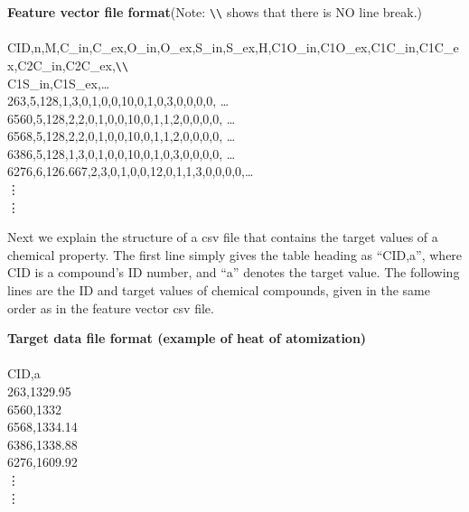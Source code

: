 \documentclass[11pt,titlepage,dvipdfmx,twoside]{article}
\begin{document}
\begin{oframed}
{\bf Feature vector file format}(Note: \verb|\\| shows that there is NO line break.)\\\\
CID,n,M,C\_in,C\_ex,O\_in,O\_ex,S\_in,S\_ex,H,C1O\_in,C1O\_ex,C1C\_in,C1C\_ex,C2C\_in,C2C\_ex,\verb|\\| \\
C1S\_in,C1S\_ex,\ldots \\
263,5,128,1,3,0,1,0,0,10,0,1,0,3,0,0,0,0, \ldots \\
6560,5,128,2,2,0,1,0,0,10,0,1,1,2,0,0,0,0, \ldots \\
6568,5,128,2,2,0,1,0,0,10,0,1,1,2,0,0,0,0, \ldots \\
6386,5,128,1,3,0,1,0,0,10,0,1,0,3,0,0,0,0, \ldots \\
6276,6,126.667,2,3,0,1,0,0,12,0,1,1,3,0,0,0,0,\ldots \\
\hspace{5mm}\vdots
\\
\hspace{5mm}\vdots

\end{oframed}


Next we explain the structure of a csv file that contains 
the target values of a chemical property.
The first line simply gives the table heading as ``CID,a'', where CID is
a compound's ID number, and ``a'' denotes the target value.
The following lines are the ID and target values of chemical compounds, 
given in the same order as in the feature vector csv file.

\bigskip

\begin{oframed}
{\bf Target data file format (example of heat of atomization)}\\\\
CID,a \\
263,1329.95 \\
6560,1332 \\
6568,1334.14 \\
6386,1338.88 \\
6276,1609.92 \\
\hspace{5mm}\vdots
\\
\hspace{5mm}\vdots

\end{oframed}
\end{document}
